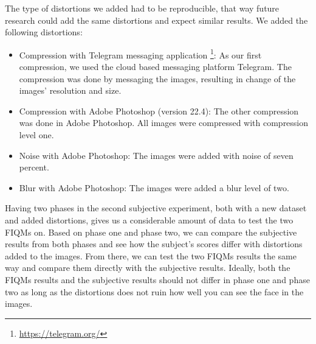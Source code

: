 The type of distortions we added had to be reproducible, that way future research could add the same distortions and expect similar results. We added the following distortions: 
%
\begin{itemize}
    \item Compression with Telegram messaging application \footnote{\url{https://telegram.org/}}: As our first compression, we used the cloud based messaging platform Telegram. The compression was done by messaging the images, resulting in change of the images' resolution and size.
    \item Compression with Adobe Photoshop (version 22.4): The other compression was done in Adobe Photoshop. All images were compressed with compression level one.
    \item Noise with Adobe Photoshop: The images were added with noise of seven percent. 
    \item Blur with Adobe Photoshop: The images were added a blur level of two. 
\end{itemize}
%
Having two phases in the second subjective experiment, both with a new dataset and added distortions, gives us a considerable amount of data to test the two FIQMs on. Based on phase one and phase two, we can compare the subjective results from both phases and see how the subject's scores differ with distortions added to the images. From there, we can test the two FIQMs results the same way and compare them directly with the subjective results. Ideally, both the FIQMs results and the subjective results should not differ in phase one and phase two as long as the distortions does not ruin how well you can see the face in the images.


